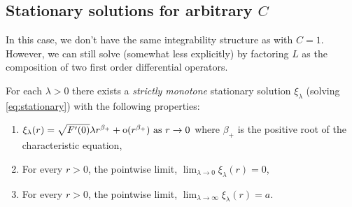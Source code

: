 \documentclass{amsart}
\begin{document}
\subsection{Stationary solutions for arbitrary \(C\)}

In this case, we don't have the same integrability structure as with \(C = 1\). However, we can still solve (somewhat less explicitly) by factoring \(L\) as the composition of two first order differential operators.

\begin{lemma}
\label{lem:stationaryC}
For each \(\lambda > 0 \) there exists a \emph{strictly monotone} stationary solution \(\xi_{\lambda}\) (solving \eqref{eq:stationary}) with the following properties:
\begin{enumerate}
\item \(\xi_{\lambda} (r) = \sqrt{F'(0)} \lambda r^{\beta_+} + \operatorname{o}(r^{\beta_+}) \text{ as } r \to 0\) where \(\beta_+\) is the positive root of the characteristic equation, \label{itm:stationaryC_asymptotic}
\item For every \(r > 0\), the pointwise limit, \(\lim_{\lambda \to 0} \xi_{\lambda} (r) = 0\), \label{itm:stationaryC_lambda_0}
\item For every \(r > 0\), the pointwise limit, \(\lim_{\lambda \to \infty} \xi_{\lambda} (r) = a\). \label{itm:stationaryC_lambda_infty}
\end{enumerate}
\end{lemma}
\end{document}
